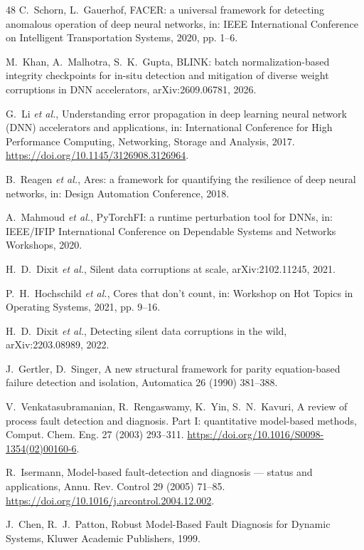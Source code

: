 \documentclass[preprint,12pt]{elsarticle}
\begin{document}
\begin{thebibliography}{48}
 C.~Schorn, L.~Gauerhof, FACER: a universal framework for detecting anomalous operation of deep neural networks, in: IEEE International Conference on Intelligent Transportation Systems, 2020, pp. 1--6.

 M.~Khan, A.~Malhotra, S.~K.~Gupta, BLINK: batch normalization-based integrity checkpoints for in-situ detection and mitigation of diverse weight corruptions in DNN accelerators, arXiv:2609.06781, 2026.

 G.~Li \textit{et al.}, Understanding error propagation in deep learning neural network (DNN) accelerators and applications, in: International Conference for High Performance Computing, Networking, Storage and Analysis, 2017. \url{https://doi.org/10.1145/3126908.3126964}.

 B.~Reagen \textit{et al.}, Ares: a framework for quantifying the resilience of deep neural networks, in: Design Automation Conference, 2018.

 A.~Mahmoud \textit{et al.}, PyTorchFI: a runtime perturbation tool for DNNs, in: IEEE/IFIP International Conference on Dependable Systems and Networks Workshops, 2020.

 H.~D.~Dixit \textit{et al.}, Silent data corruptions at scale, arXiv:2102.11245, 2021.

 P.~H.~Hochschild \textit{et al.}, Cores that don't count, in: Workshop on Hot Topics in Operating Systems, 2021, pp. 9--16.

 H.~D.~Dixit \textit{et al.}, Detecting silent data corruptions in the wild, arXiv:2203.08989, 2022.

 J.~Gertler, D.~Singer, A new structural framework for parity equation-based failure detection and isolation, Automatica 26 (1990) 381--388.

 V.~Venkatasubramanian, R.~Rengaswamy, K.~Yin, S.~N.~Kavuri, A review of process fault detection and diagnosis. Part I: quantitative model-based methods, Comput. Chem. Eng. 27 (2003) 293--311. \url{https://doi.org/10.1016/S0098-1354(02)00160-6}.

 R.~Isermann, Model-based fault-detection and diagnosis --- status and applications, Annu. Rev. Control 29 (2005) 71--85. \url{https://doi.org/10.1016/j.arcontrol.2004.12.002}.

 J.~Chen, R.~J.~Patton, Robust Model-Based Fault Diagnosis for Dynamic Systems, Kluwer Academic Publishers, 1999.


\end{thebibliography}
\end{document}
